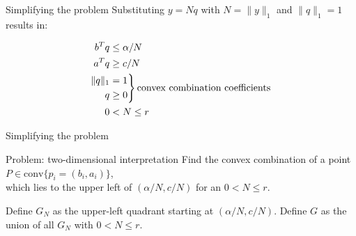 \begin{frame}{Simplifying the problem}
Substituting $y=Nq$ with $N=\|y\|_1$ and $\|q\|_1=1$ results in:

\begin{equation*}
 \begin{split}
  b^T q&\leq \alpha/N\\
  a^T q&\geq c/N\\
  \begin{aligned}
   \|q\|_1\\
   q
  \end{aligned}
  &
  \begin{rcases*}
   =1\\
   \geq 0
  \end{rcases*} \text{convex combination coefficients}  \\
  0&<N\leq r
 \end{split}
\end{equation*}
\end{frame}

\begin{frame}{Simplifying the problem}
\begin{block}{Problem: two-dimensional interpretation}
Find the convex combination of a point $P\in\mathrm{conv}\{p_i=(b_i,a_i)\}$,\\
which lies to the upper left of $(\alpha/N, c/N)$ for an $0<N\leq r$.
\end{block}

\vspace{1cm}

Define $G_N$ as the upper-left quadrant starting at $(\alpha/N, c/N)$.
Define $G$ as the union of all $G_N$ with $0<N\leq r$.

\end{frame}

